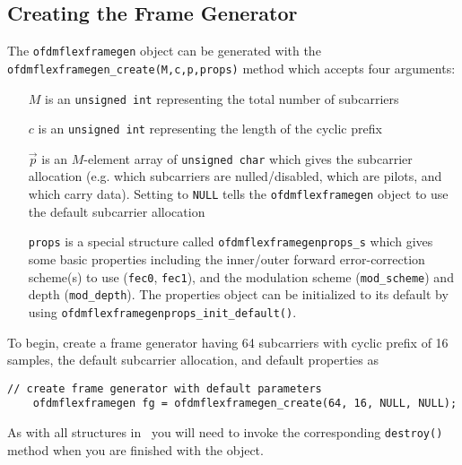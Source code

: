 \subsection{Creating the Frame Generator}
\label{tutorial:ofdmflexframe:framegen}
%
The {\tt ofdmflexframegen} object can be generated with the
{\tt ofdmflexframegen\_create(M,c,p,props)} method which accepts four arguments:
%
\begin{itemize}
\item[$M$] is an {\tt unsigned int} representing the total number of
    subcarriers
\item[$c$] is an {\tt unsigned int} representing the length of the
    cyclic prefix
\item[$\vec{p}$] is an $M$-element array of {\tt unsigned char} which
    gives the subcarrier allocation (e.g. which subcarriers
    are nulled/disabled, which are pilots, and which carry data).
    Setting to {\tt NULL} tells the {\tt ofdmflexframegen} object to use
    the default subcarrier allocation
\item[{\tt props}] is a special structure called
    {\tt ofdmflexframegenprops\_s}
    which gives some basic properties including
    the inner/outer forward error-correction scheme(s) to use
    ({\tt fec0}, {\tt fec1}),
    and the modulation scheme ({\tt mod\_scheme}) and depth
    ({\tt mod\_depth}).
    The properties object can be initialized to its default by using
    {\tt ofdmflexframegenprops\_init\_default()}.
\end{itemize}
%
To begin, create a frame generator having 64 subcarriers with cyclic
prefix of 16 samples, the default subcarrier allocation, and
default properties as
%
\begin{Verbatim}[fontsize=\small]
    // create frame generator with default parameters
    ofdmflexframegen fg = ofdmflexframegen_create(64, 16, NULL, NULL);
\end{Verbatim}
%
As with all structures in \liquid\ you will need to invoke the
corresponding {\tt destroy()} method when you are finished with the
object.

